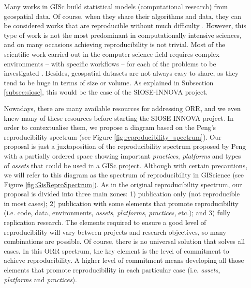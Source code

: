 \documentclass[ijgi,article,submit,moreauthors,pdftex]{Definitions/mdpi}
\begin{document}
Many works in GISc build statistical models (computational research) from geospatial data. Of course, when they share their algorithms and data, they can be considered works that are reproducible without much difficulty \cite{konkol2019computational}. However, this type of work is not the most predominant in computationally intensive sciences, and on many occasions achieving reproducibility is not trivial. Most of the scientific work carried out in the computer science field requires complex environments -- with specific workflows -- for each of the problems to be investigated \cite{barga2010provenance}. Besides, geospatial datasets are not always easy to share, as they tend to be huge in terms of size or volume. As explained in Subsection \ref{subsec:siose}, this would be the case of the SIOSE-INNOVA project.

Nowadays, there are many available resources for addressing ORR, and we even knew many of these resources before starting the SIOSE-INNOVA project. In order to contextualise them, we propose a diagram based on the Peng's \cite{peng2011reproducible} reproducibility spectrum (see Figure \ref{fig:reproducibility_spectrum}). Our proposal is just a juxtaposition of the reproducibility spectrum proposed by Peng with a partially ordered space showing important \textit{practices}, \textit{platforms} and types of \textit{assets} that could be used in a GISc project. Although with certain precautions, we will refer to this diagram as the spectrum of reproducibility in GIScience (see Figure \ref{fig:GisReproSpectrum}). As in the original reproducibility spectrum, our proposal is divided into three main zones: 1) publication only (not reproducible in most cases); 2) publication with some elements that promote reproducibility (i.e. code, data, environments, \textit{assets}, \textit{platforms}, \textit{practices}, etc.); and 3) fully replication research. The elements required to ensure a good level of reproducibility will vary between projects and research objectives, so many combinations are possible. Of course, there is no universal solution that solves all cases. In this ORR spectrum, the key element is the level of commitment to achieve reproducibility. A higher level of commitment means developing all those elements that promote reproducibility in each particular case (i.e. \textit{assets}, \textit{platforms} and \textit{practices}).
\end{document}
